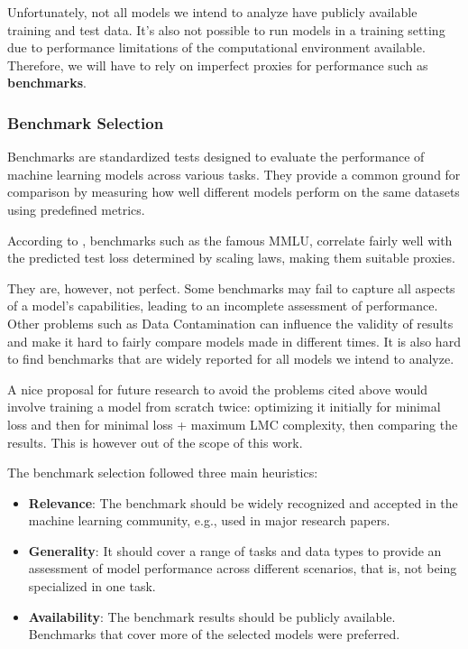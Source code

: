     Unfortunately, not all models we intend to analyze have publicly available training and test data. It's also not possible to run models in a training setting due to performance limitations of the computational environment available. Therefore, we will have to rely on imperfect proxies for performance such as \textbf{benchmarks}.

    \subsubsection{Benchmark Selection}
    \label{sec:benchmark_selection}

        Benchmarks are standardized tests designed to evaluate the performance of machine learning models across various tasks. They provide a common ground for comparison by measuring how well different models perform on the same datasets using predefined metrics. 
        
        According to \cite{Owen2024}, benchmarks such as the famous MMLU, correlate fairly well with the predicted test loss determined by scaling laws, making them suitable proxies.

        They are, however, not perfect. Some benchmarks may fail to capture all aspects of a model's capabilities, leading to an incomplete assessment of performance. Other problems such as Data Contamination \cite{Magar2022} can influence the validity of results and make it hard to fairly compare models made in different times. It is also hard to find benchmarks that are widely reported for all models we intend to analyze.

        A nice proposal for future research to avoid the problems cited above would involve training a model from scratch twice: optimizing it initially for minimal loss and then for minimal loss + maximum LMC complexity, then comparing the results. This is however out of the scope of this work.

        The benchmark selection followed three main heuristics:
        \begin{itemize}
            \item \textbf{Relevance}: The benchmark should be widely recognized and accepted in the machine learning community, e.g., used in major research papers.
            \item \textbf{Generality}: It should cover a range of tasks and data types to provide an assessment of model performance across different scenarios, that is, not being specialized in one task.
            \item \textbf{Availability}: The benchmark results should be publicly available. Benchmarks that cover more of the selected models were preferred.
        \end{itemize}


